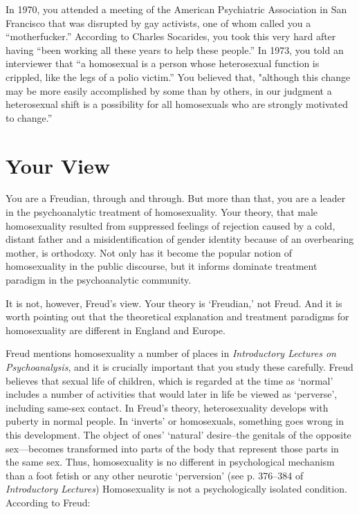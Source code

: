 \begin{refsection}
In 1970, you attended a meeting of the American Psychiatric Association in San Francisco that was disrupted by gay activists, one of whom called you a ``motherfucker.'' According to Charles Socarides, you took this very hard after having ``been working all these years to help these people.'' In 1973, you told an interviewer that ``a homosexual is a person whose heterosexual function is crippled, like the legs of a polio victim.'' You believed that, "although this change may be more easily accomplished by some than by others, in our judgment a heterosexual shift is a possibility for all homosexuals who are strongly motivated to change.”

\section{Your View}
\label{yourview}

You are a Freudian, through and through. But more than that, you are a leader in the psychoanalytic treatment of homosexuality. Your theory, that male homosexuality resulted from suppressed feelings of rejection caused by a cold, distant father and a misidentification of gender identity because of an overbearing mother, is orthodoxy. Not only has it become the popular notion of homosexuality in the public discourse, but it informs dominate treatment paradigm in the psychoanalytic community.

It is not, however, Freud's view. Your theory is `Freudian,' not Freud. And it is worth pointing out that the theoretical explanation and treatment paradigms for homosexuality are different in England and Europe.

Freud mentions homosexuality a number of places in \emph{Introductory Lectures on Psychoanalysis}, and it is crucially important that you study these carefully. Freud believes that sexual life of children, which is regarded at the time as `normal' includes a number of activities that would later in life be viewed as `perverse', including same-sex contact. In Freud's theory, heterosexuality develops with puberty in normal people. In `inverts' or homosexuals, something goes wrong in this development. The object of ones' `natural' desire--the genitals of the opposite sex—becomes transformed into parts of the body that represent those parts in the same sex. Thus, homosexuality is no different in psychological mechanism than a foot fetish or any other neurotic `perversion' (see p. 376--384 of \emph{Introductory Lectures}) Homosexuality is not a psychologically isolated condition. According to Freud:


\end{refsection}
